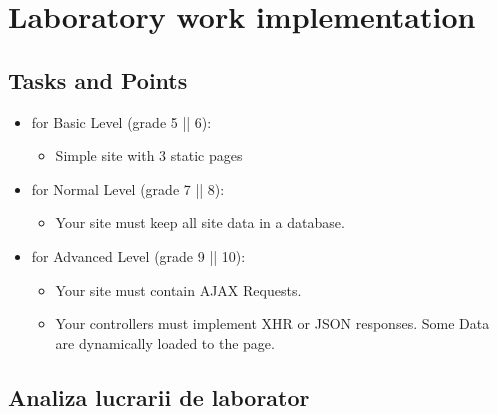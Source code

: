 \section{Laboratory work implementation}

\subsection{Tasks and Points}

\begin{itemize}
	\item for Basic Level (grade 5 || 6):
				\begin{itemize}
					\item Simple site with 3 static pages
				\end{itemize}
	\item for Normal Level (grade 7 || 8):
			\begin{itemize}
				\item Your site must keep all site data in a database.
			\end{itemize}
	\item for Advanced Level (grade 9 || 10):
		\begin{itemize}
			\item Your site must contain AJAX Requests.
			\item Your controllers must implement XHR or JSON responses. Some Data are dynamically loaded to the page.
		\end{itemize}
\end{itemize}


\subsection{Analiza lucrarii de laborator}

